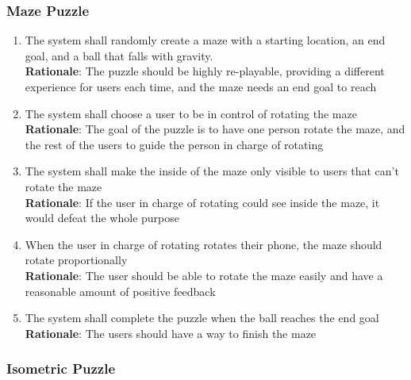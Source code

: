 \documentclass[12pt]{article}
\begin{document}
\subsubsection{Maze Puzzle}
\begin{enumerate}[label=MP\arabic*., series=MazePuzzle ]
        \item The system shall randomly create a maze with a starting location, an end goal, and a ball that falls with gravity. \\
        \textbf{Rationale}: The puzzle should be highly re-playable, providing a different experience for users each time, and the maze needs an end goal to reach
        \item The system shall choose a user to be in control of rotating the maze \\
        \textbf{Rationale}: The goal of the puzzle is to have one person rotate the maze, and the rest of the users to guide the person in charge of rotating
        \item The system shall make the inside of the maze only visible to users that can't rotate the maze \\
        \textbf{Rationale}: If the user in charge of rotating could see inside the maze, it would defeat the whole purpose
        \item When the user in charge of rotating rotates their phone, the maze should rotate proportionally \\
        \textbf{Rationale}: The user should be able to rotate the maze easily and have a reasonable amount of positive feedback
        \item The system shall complete the puzzle when the ball reaches the end goal\\
        \textbf{Rationale}: The users should have a way to finish the maze
\end{enumerate}
\subsubsection{Isometric Puzzle}
\end{document}
